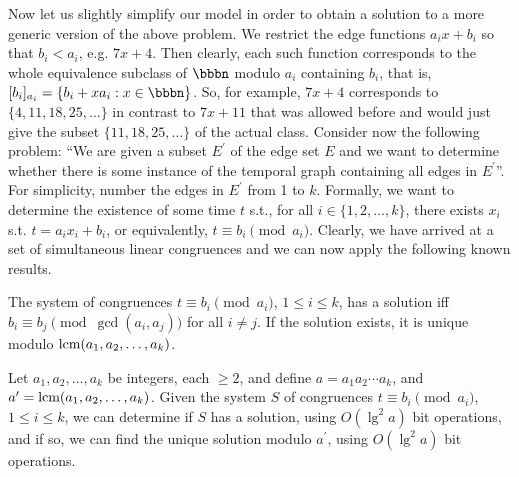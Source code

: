 \documentclass[oribibl, 11pt]{llncs}
\DeclareMathOperator{\lcm}{\textup{lcm}}
\begin{document}
Now let us slightly simplify our model in order to obtain a solution to a more generic version of the above problem. We restrict the edge functions $a_ix+b_i$ so that $b_i<a_i$, e.g. $7x+4$. Then clearly, each such function corresponds to the whole equivalence subclass of $\bbbn$ modulo $a_i$ containing $b_i$, that is, $[b_i]_{a_i}=\{b_i+xa_i:x\in\bbbn\}$. So, for example, $7x+4$ corresponds to $\{4,11,18,25,\ldots\}$ in contrast to $7x+11$ that was allowed before and would just give the subset $\{11,18,25,\ldots\}$ of the actual class. Consider now the following problem: ``We are given a subset $E^\prime$ of the edge set $E$ and we want to determine whether there is some instance of the temporal graph containing all edges in $E^\prime$''. For simplicity, number the edges in $E^\prime$ from 1 to $k$. Formally, we want to determine the existence of some time $t$ s.t., for all $i\in \{1,2,\ldots,k\}$, there exists $x_i$ s.t. $t=a_ix_i+b_i$, or equivalently, $t\equiv b_i\pmod {a_i}$. Clearly, we have arrived at a set of simultaneous linear congruences and we can now apply the following known results.

\begin{theorem}  \label{the:bs1}
The system of congruences $t\equiv b_i\pmod {a_i}$, $1\leq i\leq k$, has a solution iff $b_i\equiv b_j\pmod {\gcd(a_i,a_j)}$ for all $i\neq j$. If the solution exists, it is unique modulo $\lcm(a_1,a_2,\ldots,a_k)$.
\end{theorem}

\begin{corollary} 
Let $a_1,a_2,\ldots,a_k$ be integers, each $\geq 2$, and define $a=a_1a_2\cdots a_k$, and $a^\prime = \lcm(a_1,a_2,\ldots,a_k)$. Given the system $S$ of congruences $t\equiv b_i\pmod {a_i}$, $1\leq i\leq k$, we can determine if $S$ has a solution, using $O(\lg^2 a)$ bit operations, and if so, we can find the unique solution modulo $a^\prime$, using $O(\lg^2 a)$ bit operations.
\end{corollary}
\end{document}
